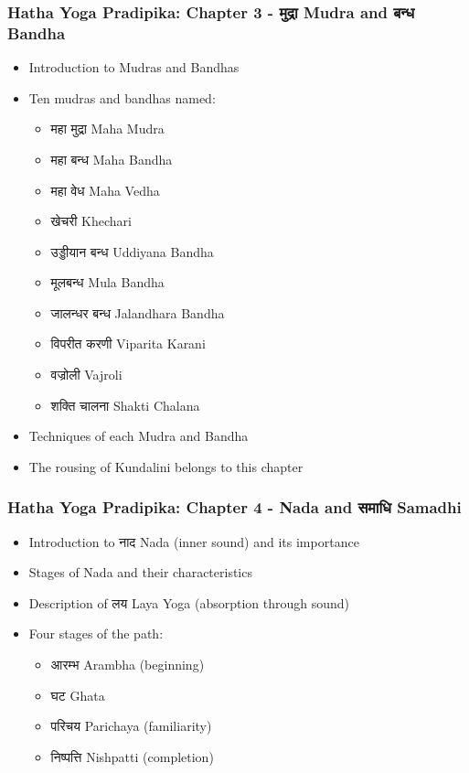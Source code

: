 \begin{frame}[fragile]\frametitle{Hatha Yoga Pradipika: Chapter 3 - मुद्रा  Mudra and बन्ध Bandha}
\begin{itemize}
    \item Introduction to Mudras and Bandhas
    \item Ten mudras and bandhas named:
    \begin{itemize}
        \item महा मुद्रा Maha Mudra
        \item महा बन्ध Maha Bandha
        \item महा  वेध  Maha Vedha
        \item खेचरी Khechari
        \item उड्डीयान बन्ध Uddiyana Bandha
        \item मूलबन्ध Mula Bandha
        \item जालन्धर बन्ध Jalandhara Bandha
        \item विपरीत करणी Viparita Karani
        \item वज्रोली Vajroli
        \item शक्ति चालना Shakti Chalana
    \end{itemize}
    \item Techniques of each Mudra and Bandha
    \item The rousing of Kundalini belongs to this chapter
\end{itemize}
\end{frame}



\begin{frame}[fragile]\frametitle{Hatha Yoga Pradipika: Chapter 4 - Nada and समाधि Samadhi}
\begin{itemize}
    \item Introduction to नाद  Nada (inner sound) and its importance
    \item Stages of Nada and their characteristics
    \item Description of लय  Laya Yoga (absorption through sound)
    \item Four stages of the path:
    \begin{itemize}
        \item आरम्भ  Arambha (beginning)
        \item घट Ghata
        \item परिचय Parichaya (familiarity)
        \item निष्पत्ति Nishpatti (completion)
    \end{itemize}
\end{itemize}
\end{frame}


